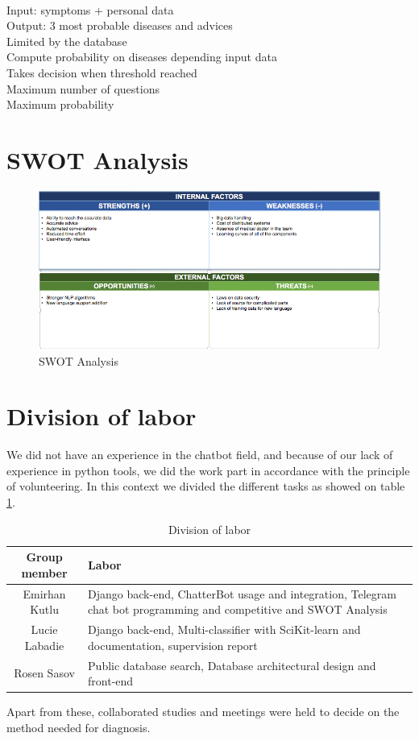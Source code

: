 \paragraph{}
Input: symptoms + personal data \\
Output: 3 most probable diseases and advices \\
Limited by the database \\
Compute probability on diseases depending input data \\
Takes decision when threshold reached \\
Maximum number of questions \\
Maximum probability 


\section{SWOT Analysis}

\begin{figure}[H]
	\centering
	\includegraphics[width=\textwidth]{swot}
	\caption{SWOT Analysis}
	\label{swot}
\end{figure}

\section{Division of labor}

We did not have an experience in the chatbot field, and because of our lack of experience in python	tools, we did the work part in accordance with the principle of volunteering. In this context we divided the different tasks as showed on table \ref{labor}.
\begin{table}[H]
	\centering
	\begin{tabular}{|c|p{10cm}|}
		\hline
		\textbf{Group member} & \textbf{Labor} \\
		\hline
		Emirhan	Kutlu & Django back-end, ChatterBot usage and integration, Telegram chat bot programming and competitive and SWOT Analysis \\
		\hline
		Lucie Labadie & Django back-end, Multi-classifier with SciKit-learn and documentation, supervision report \\
		\hline
		Rosen Sasov & Public database search, Database architectural design and front-end \\
		\hline
	\end{tabular}
	\caption{Division of labor}
	\label{labor}
\end{table}	

Apart from these, collaborated studies and meetings	were held to decide on the method needed for diagnosis.